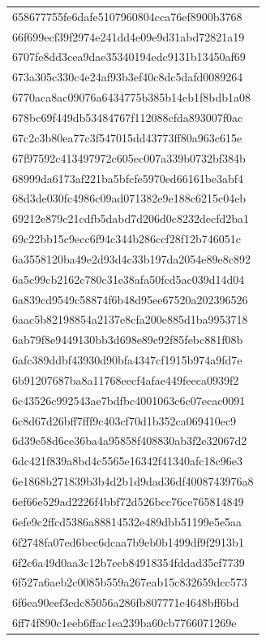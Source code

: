 \begin{tabular}{l}
658677755fe6dafe5107960804cca76ef8900b3768 \\
66f699ecf39f2974e241dd4e09e9d31abd72821a19 \\
6707fe8dd3cea9dae35340194edc9131b13450af69 \\
673a305c330c4e24af93b3ef40c8dc5dafd0089264 \\
6770aca8ac09076a6434775b385b14eb1f8bdb1a08 \\
678bc69f449db53484767f112088cfda893007f0ac \\
67c2c3b80ea77c3f547015dd43773ff80a963c615e \\
67f97592c413497972c605ec007a339b0732bf384b \\
68999da6173af221ba5bfcfe5970ed66161be3abf4 \\
68d3de030fc4986c09ad071382e9e188c6215c04eb \\
69212e879c21cdfb5dabd7d206d0c8232decfd2ba1 \\
69c22bb15c9ecc6f94c344b286ccf28f12b746051c \\
6a3558120ba49e2d93d4c33b197da2054e89e8c892 \\
6a5c99cb2162c780c31e38afa50fcd5ac039d14d04 \\
6a839cd9549c58874f6b48d95ee67520a202396526 \\
6aac5b82198854a2137e8cfa200e885d1ba9953718 \\
6ab79f8e9449130bb3d698e89c92f85febc881f08b \\
6afc389ddbf43930d90bfa4347cf1915b974a9fd7e \\
6b91207687ba8a11768eecf4afae449feeca0939f2 \\
6c43526c992543ae7bdfbc4001063c6c07ecac0091 \\
6c8d67d26bff7fff9c403cf70d1b352ca069410ec9 \\
6d39e58d6ce36ba4a95858f408830ab3f2e32067d2 \\
6dc421f839a8bd4c5565e16342f41340afc18c96e3 \\
6e1868b271839b3b4d2b1d9dad36df4008743976a8 \\
6ef66e529ad2226f4bbf72d526bcc76ce765814849 \\
6efe9c2ffcd5386a88814532e489dbb51199e5e5aa \\
6f2748fa07ed6bec6dcaa7b9eb0b1499df9f2913b1 \\
6f2c6a49d0aa3c12b7eeb84918354fddad35cf7739 \\
6f527a6aeb2c0085b559a267eab15c832659dcc573 \\
6f6ea90eef3edc85056a286fb807771e4648bff6bd \\
6ff74f890c1eeb6ffac1ea239ba60cb7766071269e \\

\end{tabular}
